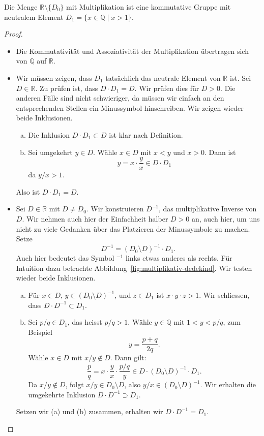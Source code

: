 \documentclass[../main.tex]{subfiles}
\begin{document}
\begin{lemma}\label{lem:r-mal-gruppe}
  Die Menge $\mathbb R \setminus \{D_{0}\}$ mit Multiplikation ist eine
  kommutative Gruppe mit neutralem Element
  \(D_{1} = \{x \in \mathbb Q \mid x > 1\}\).
\end{lemma}

\begin{proof}
  \leavevmode
  \begin{itemize}
    \item Die Kommutativität und Assoziativität der Multiplikation
      übertragen sich von $\mathbb Q$ auf $\mathbb R$.
    \item Wir müssen zeigen, dass $D_{1}$ tatsächlich das neutrale
      Element von $\mathbb R$ ist.
      Sei $D \in \mathbb R$. Zu prüfen ist, dass $D \cdot D_{1} = D$.
      Wir prüfen dies für $D > 0$. Die anderen Fälle sind nicht
      schwieriger, da müssen wir einfach an den entsprechenden Stellen
      ein Minussymbol hinschreiben.
      Wir zeigen wieder beide Inklusionen.
      \begin{enumerate}[(a)]
        \item Die Inklusion $D \cdot D_{1} \subset D$ ist klar nach Definition.
        \item Sei umgekehrt $y \in D$. Wähle $x \in D$ mit $x < y$ und $x > 0$.
          Dann ist \[y = x \cdot \frac{y}{x} \in D \cdot D_{1}\] da $y/x > 1$.
      \end{enumerate}
      Also ist $D \cdot D_{1} = D$.
    \item
      Sei $D \in \mathbb R$ mit $D \neq D_{0}$.
      Wir konstruieren $D^{-1}$, das multiplikative Inverse von $D$.
      Wir nehmen auch hier der Einfachheit halber $D > 0$ an,
      auch hier, um uns nicht zu viele Gedanken über das Platzieren
      der Minussymbole zu machen. Setze
      \[D^{-1} = {(D_{0} \setminus D)}^{-1} \cdot D_{1}.\]
      Auch hier bedeutet das Symbol ${}^{-1}$ links etwas anderes als rechts.
      Für Intuition dazu betrachte Abbildung~\ref{fig:multiplikativ-dedekind}.
      Wir testen wieder beide Inklusionen.
      \begin{enumerate}[(a)]
        \item Für $x \in D$, $y \in {(D_{0} \setminus D)}^{-1}$, und
          $z \in D_{1}$ ist $x \cdot y \cdot z > 1$.
          Wir schliessen, dass $D \cdot D^{-1} \subset D_{1}$.
        \item Sei $p/q \in D_{1}$, das heisst $p/q > 1$.
          Wähle $y \in \mathbb Q$ mit $1 < y < p/q$, zum Beispiel
          \[y = \frac{p + q}{2q}.\]
          Wähle $x \in D$ mit $x/y \notin D$. Dann gilt:
          \[\frac{p}{q} = x \cdot \frac{y}{x} \cdot
            \frac{p/q}{y}\in D \cdot
          {(D_{0} \setminus D)}^{-1} \cdot D_{1}.\]
          Da $x/y \notin D$, folgt $x / y \in D_{0} \setminus D$,
          also $y/x \in {(D_{0} \setminus D)}^{-1}$.
          Wir erhalten die umgekehrte Inklusion $D \cdot D^{-1} \supset D_{1}$.
      \end{enumerate}
      Setzen wir (a) und (b) zusammen, erhalten wir $D \cdot D^{-1} = D_{1}$.
      \qedhere
  \end{itemize}
\end{proof}
\end{document}
